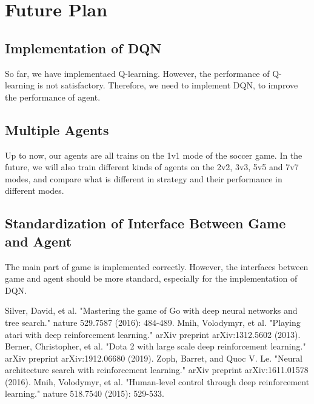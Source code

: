 \documentclass[14pt]{extarticle}
\begin{document}
\section{Future Plan}

\subsection{Implementation of DQN}
So far, we have implementaed Q-learning. However, the performance of Q-learning is not satisfactory. Therefore, we need to implement DQN, to improve the performance of agent.

\subsection{Multiple Agents}
Up to now, our agents are all trains on the 1v1 mode of the soccer game. In the future, we will also train different kinds of agents on the 2v2, 3v3, 5v5 and 7v7 modes, and compare what is different in strategy and their performance in different modes.

\subsection{Standardization of Interface Between Game and Agent}
The main part of game is implemented correctly. However, the interfaces between game and agent should be more standard, especially for the implementation of DQN.



\begin{thebibliography}{99}
	Silver, David, et al. "Mastering the game of Go with deep neural networks and tree search." nature 529.7587 (2016): 484-489.
	Mnih, Volodymyr, et al. "Playing atari with deep reinforcement learning." arXiv preprint arXiv:1312.5602 (2013).
	Berner, Christopher, et al. "Dota 2 with large scale deep reinforcement learning." arXiv preprint arXiv:1912.06680 (2019).
    Zoph, Barret, and Quoc V. Le. "Neural architecture search with reinforcement learning." arXiv preprint arXiv:1611.01578 (2016).
    Mnih, Volodymyr, et al. "Human-level control through deep reinforcement learning." nature 518.7540 (2015): 529-533.
\end{thebibliography}
\end{document}
